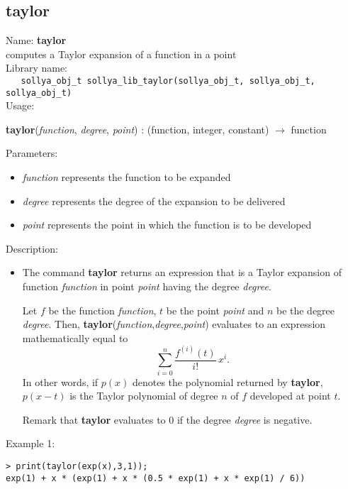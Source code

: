 \subsection{taylor}
\label{labtaylor}
\noindent Name: \textbf{taylor}\\
\phantom{aaa}computes a Taylor expansion of a function in a point\\[0.2cm]
\noindent Library name:\\
\verb|   sollya_obj_t sollya_lib_taylor(sollya_obj_t, sollya_obj_t, sollya_obj_t)|\\[0.2cm]
\noindent Usage: 
\begin{center}
\textbf{taylor}(\emph{function}, \emph{degree}, \emph{point}) : (\textsf{function}, \textsf{integer}, \textsf{constant}) $\rightarrow$ \textsf{function}\\
\end{center}
Parameters: 
\begin{itemize}
\item \emph{function} represents the function to be expanded
\item \emph{degree} represents the degree of the expansion to be delivered
\item \emph{point} represents the point in which the function is to be developed
\end{itemize}
\noindent Description: \begin{itemize}

\item The command \textbf{taylor} returns an expression that is a Taylor expansion
   of function \emph{function} in point \emph{point} having the degree \emph{degree}.
    
   Let $f$ be the function \emph{function}, $t$ be the point \emph{point} and
   $n$ be the degree \emph{degree}. Then, \textbf{taylor}(\emph{function},\emph{degree},\emph{point}) 
   evaluates to an expression mathematically equal to
   $$\sum\limits_{i=0}^n \frac{f^{(i)}\left(t\right)}{i!}\,x^i.$$
   In other words, if $p(x)$ denotes the polynomial returned by \textbf{taylor},
   $p(x-t)$ is the Taylor polynomial of degree $n$ of $f$ developed at point $t$.
    
   Remark that \textbf{taylor} evaluates to $0$ if the degree \emph{degree} is negative.
\end{itemize}
\noindent Example 1: 
\begin{center}\begin{minipage}{15cm}\begin{Verbatim}[frame=single]
> print(taylor(exp(x),3,1));
exp(1) + x * (exp(1) + x * (0.5 * exp(1) + x * exp(1) / 6))
\end{Verbatim}
\end{minipage}\end{center}
